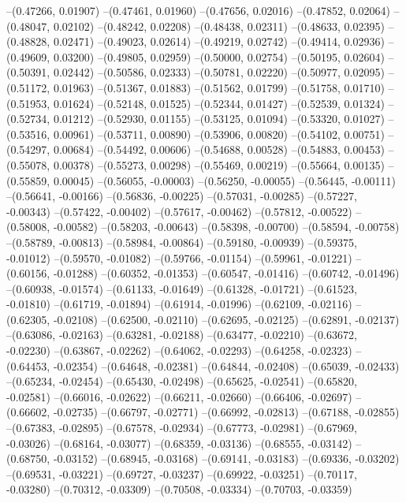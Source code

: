 --(0.47266, 0.01907)
--(0.47461, 0.01960)
--(0.47656, 0.02016)
--(0.47852, 0.02064)
--(0.48047, 0.02102)
--(0.48242, 0.02208)
--(0.48438, 0.02311)
--(0.48633, 0.02395)
--(0.48828, 0.02471)
--(0.49023, 0.02614)
--(0.49219, 0.02742)
--(0.49414, 0.02936)
--(0.49609, 0.03200)
--(0.49805, 0.02959)
--(0.50000, 0.02754)
--(0.50195, 0.02604)
--(0.50391, 0.02442)
--(0.50586, 0.02333)
--(0.50781, 0.02220)
--(0.50977, 0.02095)
--(0.51172, 0.01963)
--(0.51367, 0.01883)
--(0.51562, 0.01799)
--(0.51758, 0.01710)
--(0.51953, 0.01624)
--(0.52148, 0.01525)
--(0.52344, 0.01427)
--(0.52539, 0.01324)
--(0.52734, 0.01212)
--(0.52930, 0.01155)
--(0.53125, 0.01094)
--(0.53320, 0.01027)
--(0.53516, 0.00961)
--(0.53711, 0.00890)
--(0.53906, 0.00820)
--(0.54102, 0.00751)
--(0.54297, 0.00684)
--(0.54492, 0.00606)
--(0.54688, 0.00528)
--(0.54883, 0.00453)
--(0.55078, 0.00378)
--(0.55273, 0.00298)
--(0.55469, 0.00219)
--(0.55664, 0.00135)
--(0.55859, 0.00045)
--(0.56055, -0.00003)
--(0.56250, -0.00055)
--(0.56445, -0.00111)
--(0.56641, -0.00166)
--(0.56836, -0.00225)
--(0.57031, -0.00285)
--(0.57227, -0.00343)
--(0.57422, -0.00402)
--(0.57617, -0.00462)
--(0.57812, -0.00522)
--(0.58008, -0.00582)
--(0.58203, -0.00643)
--(0.58398, -0.00700)
--(0.58594, -0.00758)
--(0.58789, -0.00813)
--(0.58984, -0.00864)
--(0.59180, -0.00939)
--(0.59375, -0.01012)
--(0.59570, -0.01082)
--(0.59766, -0.01154)
--(0.59961, -0.01221)
--(0.60156, -0.01288)
--(0.60352, -0.01353)
--(0.60547, -0.01416)
--(0.60742, -0.01496)
--(0.60938, -0.01574)
--(0.61133, -0.01649)
--(0.61328, -0.01721)
--(0.61523, -0.01810)
--(0.61719, -0.01894)
--(0.61914, -0.01996)
--(0.62109, -0.02116)
--(0.62305, -0.02108)
--(0.62500, -0.02110)
--(0.62695, -0.02125)
--(0.62891, -0.02137)
--(0.63086, -0.02163)
--(0.63281, -0.02188)
--(0.63477, -0.02210)
--(0.63672, -0.02230)
--(0.63867, -0.02262)
--(0.64062, -0.02293)
--(0.64258, -0.02323)
--(0.64453, -0.02354)
--(0.64648, -0.02381)
--(0.64844, -0.02408)
--(0.65039, -0.02433)
--(0.65234, -0.02454)
--(0.65430, -0.02498)
--(0.65625, -0.02541)
--(0.65820, -0.02581)
--(0.66016, -0.02622)
--(0.66211, -0.02660)
--(0.66406, -0.02697)
--(0.66602, -0.02735)
--(0.66797, -0.02771)
--(0.66992, -0.02813)
--(0.67188, -0.02855)
--(0.67383, -0.02895)
--(0.67578, -0.02934)
--(0.67773, -0.02981)
--(0.67969, -0.03026)
--(0.68164, -0.03077)
--(0.68359, -0.03136)
--(0.68555, -0.03142)
--(0.68750, -0.03152)
--(0.68945, -0.03168)
--(0.69141, -0.03183)
--(0.69336, -0.03202)
--(0.69531, -0.03221)
--(0.69727, -0.03237)
--(0.69922, -0.03251)
--(0.70117, -0.03280)
--(0.70312, -0.03309)
--(0.70508, -0.03334)
--(0.70703, -0.03359)
